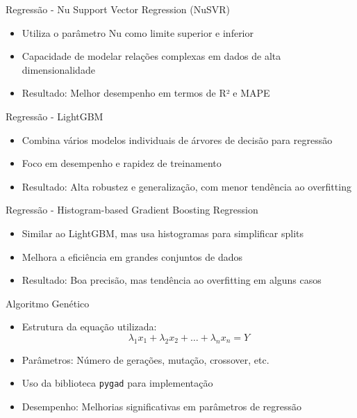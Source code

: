 \documentclass{beamer}
\begin{document}
\begin{frame}{Regressão - Nu Support Vector Regression (NuSVR)}
    \begin{itemize}
        \item Utiliza o parâmetro Nu como limite superior e inferior
        \item Capacidade de modelar relações complexas em dados de alta dimensionalidade
        \item Resultado: Melhor desempenho em termos de R² e MAPE
    \end{itemize}
\end{frame}

\begin{frame}{Regressão - LightGBM}
    \begin{itemize}
        \item Combina vários modelos individuais de árvores de decisão para regressão
        \item Foco em desempenho e rapidez de treinamento
        \item Resultado: Alta robustez e generalização, com menor tendência ao overfitting
    \end{itemize}
\end{frame}

\begin{frame}{Regressão - Histogram-based Gradient Boosting Regression}
    \begin{itemize}
        \item Similar ao LightGBM, mas usa histogramas para simplificar splits
        \item Melhora a eficiência em grandes conjuntos de dados
        \item Resultado: Boa precisão, mas tendência ao overfitting em alguns casos
    \end{itemize}
\end{frame}

\begin{frame}{Algoritmo Genético}
    \begin{itemize}
        \item Estrutura da equação utilizada:
              \[
                  \lambda_1 x_1 + \lambda_2 x_2 + \dots + \lambda_n x_n = Y
              \]
        \item Parâmetros: Número de gerações, mutação, crossover, etc.
        \item Uso da biblioteca \texttt{pygad} para implementação
        \item Desempenho: Melhorias significativas em parâmetros de regressão
    \end{itemize}
\end{frame}
\end{document}
